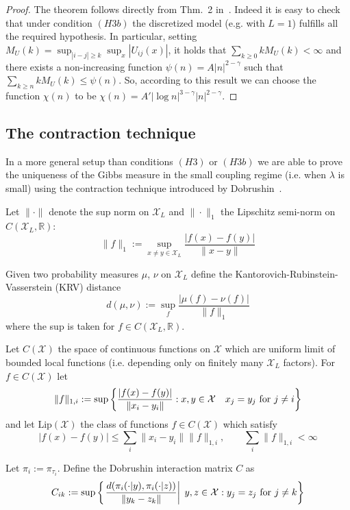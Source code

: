 \documentclass[a4paper,12pt,reqno]{amsart}
\newcommand{\R}{\mathbb{R}}
\newcommand{\X}{\mathcal{X}}
\begin{document}
\begin{proof}
The theorem follows directly from Thm.~2 in~\cite{dobr-uni}. Indeed
it is easy to check that under condition $(H3b)$  
 the discretized model (e.g. with $L=1$) fulfills all the
required hypothesis.
In particular, setting $M_U(k) = \sup_{|i-j| \ge k} \sup_x
|U_{ij}(x)|$,  it holds that
$
\sum_{k \ge 0} k M_U(k) < \infty  
$
and  there exists a non-increasing function $\psi(n) = A
|n|^{2-\gamma}$ such that
$
\sum_{k \ge n} k M_U(k)\le \psi(n) 
$.  So, according to this result we can choose the function $\chi(n)$
to be $\chi(n) = A' |\log n|^{3-\gamma} |n|^{2-\gamma}$.
\end{proof}

\subsection{The contraction technique}
In a more general setup than conditions $(H3)$ or $(H3b)$ we are able to prove
 the uniqueness of the Gibbs measure in the small coupling regime
(i.e. when $\lambda$ is small) using the contraction technique
introduced by Dobrushin~\cite{Dobr1,Dobr2}.   

Let $\|\cdot\|$ denote the sup norm on $\X_L$ and $\|\cdot\|_1$ the
Lipschitz semi-norm on $C(\X_L,\R)$: 
\begin{equation}
 \|f\|_1 := \sup_{x\neq y \in \X_L} \frac{|f(x)-f(y)|}{\|x-y\|} 
\end{equation}

Given two probability
measures $\mu$, $\nu$ on $\X_L$ define the
Kantorovich-Rubinstein-Vasserstein (KRV) distance
$$
d(\mu,\nu) := \sup_{f} \frac{|\mu(f)-\nu(f)|}{\|f\|_1}
$$
where the sup is taken for $f \in C(\X_L,\R)$.

Let $C(\X)$ the space of continuous functions on $\X$ which are
uniform limit of bounded local functions (i.e. depending only on
finitely many $\X_L$ factors).
For $f \in C(\X)$ let
\begin{equation}
  \label{eq:lip1}
\|f\|_{1,i} :=  \sup \left\{ \frac{|f(x)-f(y)|}{\|x_i-y_i\|} :
 x,y \in\X  \quad \text{$ x_j=y_j$ for $j \neq i$} \right\}  
\end{equation}
and let $\text{Lip}(\X)$ the class of functions $f \in C(\X)$ which satisfy
$$
|f(x)-f(y)| \le \sum_i \|x_i-y_i\| \|f\|_{1,i}, \qquad \sum_i
\|f\|_{1,i} < \infty 
$$

Let $\pi_i := \pi_{\tau_i}$. Define the Dobrushin interaction matrix $C$ as
\begin{equation}
C_{ik} :=
\sup\left\{\left. \frac{d(\pi_{i}(\cdot|y),\pi_{i}(\cdot|z))}{\|y_k-z_k\|}
\right | \; y,z \in\X :  \text{$ y_j=z_j$ for $j \neq k$} \right\}  
\end{equation}
\end{document}
